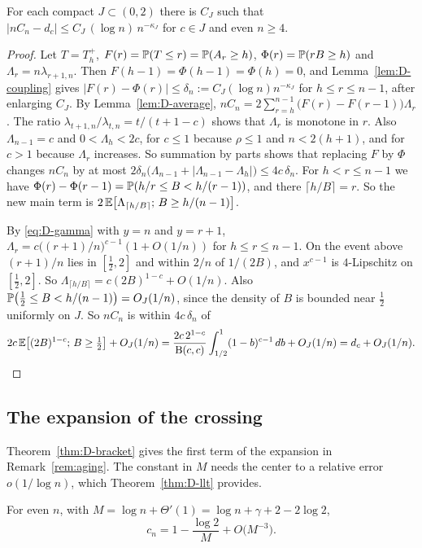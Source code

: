 \begin{theorem}\label{thm:D-llt}
For each compact $J\subset(0,2)$ there is $C_J$ such that
$\bigl|nC_n-d_c\bigr|\le C_J\,(\log n)\,n^{-\kappa_J}$ for $c\in J$ and even $n\ge4$.
\end{theorem}

\begin{proof}
Let $T=T^+_h$, $F(r)=\mathbb{P}(T\le r)=\mathbb{P}(A_r\ge h)$, $\Phi(r)=\mathbb{P}(rB\ge h)$ and
$\Lambda_r=n\lambda_{r+1,n}$. Then $F(h-1)=\Phi(h-1)=\Phi(h)=0$, and Lemma~\ref{lem:D-coupling}
gives $|F(r)-\Phi(r)|\le\delta_n:=C_J(\log n)n^{-\kappa_J}$ for $h\le r\le n-1$, after
enlarging $C_J$. By Lemma~\ref{lem:D-average},
$nC_n=2\sum_{r=h}^{n-1}\bigl(F(r)-F(r-1)\bigr)\Lambda_r$. The ratio
$\lambda_{t+1,n}/\lambda_{t,n}=t/(t+1-c)$ shows that $\Lambda_r$ is monotone in $r$. Also
$\Lambda_{n-1}=c$ and $0<\Lambda_h<2c$, for $c\le1$ because $\rho\le1$ and $n<2(h+1)$, and for
$c>1$ because $\Lambda_r$ increases. So summation by parts shows that replacing $F$ by $\Phi$
changes $nC_n$ by at most $2\delta_n\bigl(\Lambda_{n-1}+|\Lambda_{n-1}-\Lambda_h|\bigr)\le4c\,\delta_n$.
For $h<r\le n-1$ we have $\Phi(r)-\Phi(r-1)=\mathbb{P}(h/r\le B<h/(r-1))$, and there
$\lceil h/B\rceil=r$. So the new main term is
$2\,\mathbb{E}\bigl[\Lambda_{\lceil h/B\rceil};\,B\ge h/(n-1)\bigr]$.

By \eqref{eq:D-gamma} with $y=n$ and $y=r+1$, $\Lambda_r=c\bigl((r+1)/n\bigr)^{c-1}(1+O(1/n))$
for $h\le r\le n-1$. On the event above $(r+1)/n$ lies in $[\frac12,2]$ and within $2/n$ of
$1/(2B)$, and $x^{c-1}$ is $4$-Lipschitz on $[\frac12,2]$. So
$\Lambda_{\lceil h/B\rceil}=c(2B)^{1-c}+O(1/n)$. Also
$\mathbb{P}\bigl(\frac12\le B<h/(n-1)\bigr)=O_J(1/n)$, since the density of $B$ is bounded near
$\frac12$ uniformly on $J$. So $nC_n$ is within $4c\,\delta_n$ of
\[
2c\,\mathbb{E}\bigl[(2B)^{1-c};\,B\ge\tfrac12\bigr]+O_J(1/n)
=\frac{2c\,2^{1-c}}{\mathrm B(c,c)}\int_{1/2}^1(1-b)^{c-1}\,db+O_J(1/n)=d_c+O_J(1/n).\qedhere
\]
\end{proof}

\subsection{The expansion of the crossing}

Theorem~\ref{thm:D-bracket} gives the first term of the expansion in Remark~\ref{rem:aging}.
The constant in $M$ needs the center to a relative error $o(1/\log n)$, which
Theorem~\ref{thm:D-llt} provides.

\begin{theorem}\label{thm:D-crossing}
For even $n$, with $M=\log n+\Theta'(1)=\log n+\gamma+2-2\log2$,
\[
c_n=1-\frac{\log2}{M}+O\bigl(M^{-3}\bigr).
\]
\end{theorem}


